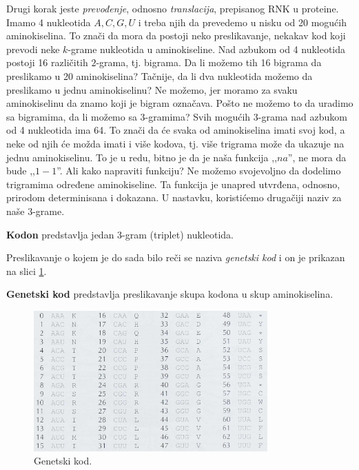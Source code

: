 Drugi korak jeste \textit{prevođenje}, odnosno \textit{translacija}, prepisanog RNK u proteine. Imamo 4 nukleotida $A, C, G, U$ i treba njih da prevedemo u nisku od 20 mogućih aminokiselina. To znači da mora da postoji neko preslikavanje, nekakav kod koji prevodi neke $k$-grame nukleotida u aminokiseline. Nad azbukom od 4 nukleotida postoji 16 različitih $2$-grama, tj. bigrama. Da li možemo tih 16 bigrama da preslikamo u 20 aminokiselina? Tačnije, da li dva nukleotida možemo da preslikamo u jednu aminokiselinu? Ne možemo, jer moramo za svaku aminokiselinu da znamo koji je bigram označava. Pošto ne možemo to da uradimo sa bigramima, da li možemo sa $3$-gramima? Svih mogućih $3$-grama nad azbukom od 4 nukleotida ima 64. To znači da će svaka od aminokiselina imati svoj kod, a neke od njih će možda imati i više kodova, tj. više trigrama može da ukazuje na jednu aminokiselinu. To je u redu, bitno je da je naša funkcija ,,$na$'', ne mora da bude ,,$1-1$''. Ali kako napraviti funkciju? Ne možemo svojevoljno da dodelimo trigramima određene aminokiseline. Ta funkcija je unapred utvrđena, odnosno, prirodom determinisana i dokazana. U nastavku, koristićemo drugačiji naziv za naše $3$-grame. 
\\
\begin{definicija}
\textbf{Kodon} predstavlja jedan $3$-gram (triplet) nukleotida. \\
\end{definicija}

\noindent Preslikavanje o kojem je do sada bilo reči se naziva \textit{genetski kod} i on je prikazan na slici \ref{slika:genetskiKod}.
\\
\begin{definicija}
\textbf{Genetski kod} predstavlja preslikavanje skupa kodona u skup aminokiselina. \\
\end{definicija}


\begin{figure}[h!]
	\centering
	\includegraphics[width=0.8\textwidth]{poglavlja/4/slike/genetskiKod.png}
	\caption{Genetski kod.}
	\label{slika:genetskiKod}
\end{figure} 


